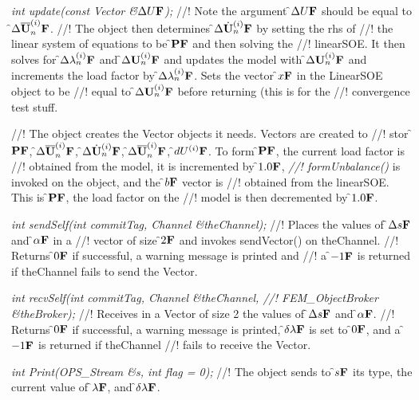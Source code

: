 {\em int update(const Vector \&\f$\Delta U{\bf F}$);}
//! Note the argument \f$\Delta U{\bf F}$ should be equal to \f$\Delta \overline{\bf U}_n^{(i)}{\bf F}$.
//! The object then determines \f$\Delta \dot{\bf U}_n^{(i)}{\bf F}$ by setting the rhs of
//! the linear system of equations to be \f${\bf P}{\bf F}$ and then solving the
//! linearSOE. It then solves for
\f$\Delta \lambda_n^{(i)}{\bf F}$ and \f$\Delta {\bf U}_n^{(i)}{\bf F}$ and updates the model with
\f$\Delta {\bf U}_n^{(i)}{\bf F}$ and increments the load factor by \f$\Delta
\lambda_n^{(i)}{\bf F}$. Sets the vector \f$x{\bf F}$ in the LinearSOE object to be
//! equal to \f$\Delta {\bf U}_n^{(i)}{\bf F}$ before returning (this is for the
//! convergence test stuff.


//! The object creates the Vector objects it needs. Vectors are created to
//! stor \f${\bf P}{\bf F}$, \f$\Delta \overline{\bf U}_n^{(i)}{\bf F}$, \f$\Delta \dot{\bf U}_n^{(i)}{\bf F}$, \f$\Delta
\overline{\bf U}_n^{(i)}{\bf F}$, \f$dU^{(i)}{\bf F}$. To form \f${\bf P}{\bf F}$, the current load factor is
//! obtained from the model, it is incremented by \f$1.0{\bf F}$, {\em
//! formUnbalance()} is invoked on the object, and the \f$b{\bf F}$ vector is
//! obtained from the linearSOE. This is \f${\bf P}{\bf F}$, the load factor on the
//! model is then decremented by \f$1.0{\bf F}$.

{\em int sendSelf(int commitTag, Channel \&theChannel); } 
//! Places the values of \f$\Delta s{\bf F}$ and \f$\alpha{\bf F}$ in a
//! vector of size \f$2{\bf F}$ and invokes sendVector() on \p theChannel.
//! Returns \f$0{\bf F}$ if successful, a warning message is printed and
//! a \f$-1{\bf F}$ is returned if \p theChannel fails to send the Vector.

{\em int recvSelf(int commitTag, Channel \&theChannel, 
//! FEM\_ObjectBroker \&theBroker); } 
//! Receives in a Vector of size 2 the values of \f$\Delta s{\bf F}$ and \f$\alpha{\bf F}$.
//! Returns \f$0{\bf F}$ if successful, a warning message is printed, \f$\delta
\lambda{\bf F}$ is set to \f$0{\bf F}$, and a \f$-1{\bf F}$ is returned if \p theChannel
//! fails to receive the Vector.

{\em int Print(OPS\_Stream \&s, int flag = 0);}
//! The object sends to \f$s{\bf F}$ its type, the current value of \f$\lambda{\bf F}$, and
\f$\delta \lambda{\bf F}$. 
